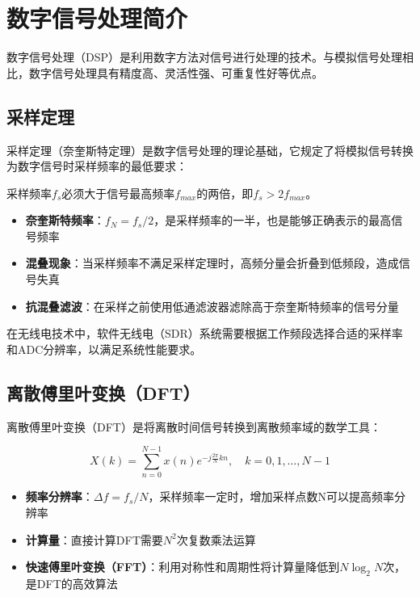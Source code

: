 \documentclass[12pt,UTF8]{ctexbook}
\begin{document}
\section{数字信号处理简介}

数字信号处理（DSP）是利用数字方法对信号进行处理的技术。与模拟信号处理相比，数字信号处理具有精度高、灵活性强、可重复性好等优点。

\subsection{采样定理}

采样定理（奈奎斯特定理）是数字信号处理的理论基础，它规定了将模拟信号转换为数字信号时采样频率的最低要求：

采样频率$f_s$必须大于信号最高频率$f_{max}$的两倍，即$f_s > 2f_{max}$。

\begin{itemize}[leftmargin=3.5em]
    \item \textbf{奈奎斯特频率}：$f_N = f_s/2$，是采样频率的一半，也是能够正确表示的最高信号频率
    \item \textbf{混叠现象}：当采样频率不满足采样定理时，高频分量会折叠到低频段，造成信号失真
    \item \textbf{抗混叠滤波}：在采样之前使用低通滤波器滤除高于奈奎斯特频率的信号分量
\end{itemize}

在无线电技术中，软件无线电（SDR）系统需要根据工作频段选择合适的采样率和ADC分辨率，以满足系统性能要求。

\subsection{离散傅里叶变换（DFT）}

离散傅里叶变换（DFT）是将离散时间信号转换到离散频率域的数学工具：

$$X(k) = \sum_{n=0}^{N-1}x(n)e^{-j\frac{2\pi}{N}kn}, \quad k = 0, 1, \ldots, N-1$$

\begin{itemize}[leftmargin=3.5em]
    \item \textbf{频率分辨率}：$\Delta f = f_s/N$，采样频率一定时，增加采样点数N可以提高频率分辨率
    \item \textbf{计算量}：直接计算DFT需要$N^2$次复数乘法运算
    \item \textbf{快速傅里叶变换（FFT）}：利用对称性和周期性将计算量降低到$N\log_2 N$次，是DFT的高效算法
\end{itemize}
\end{document}
